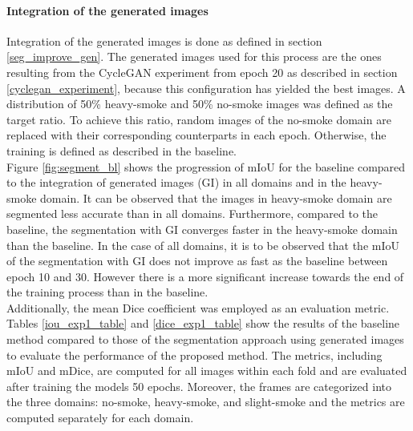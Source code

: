 \paragraph{Integration of the generated images} Integration of the generated images is done as defined in section \ref{seg_improve_gen}.
The generated images used for this process are the ones resulting from the CycleGAN experiment from epoch 20 as described in section \ref{cyclegan_experiment}, because this configuration has yielded the best images.
A distribution of 50\% heavy-smoke and 50\% no-smoke images was defined as the target ratio.
To achieve this ratio, random images of the no-smoke domain are replaced with their corresponding counterparts in each epoch.
Otherwise, the training is defined as described in the baseline.\\
Figure \ref{fig:segment_bl} shows the progression of mIoU for the baseline compared to the integration of generated images (GI) in all domains and in the heavy-smoke domain.
It can be observed that the images in heavy-smoke domain are segmented less accurate than in all domains.  
Furthermore, compared to the baseline, the segmentation with GI converges faster in the heavy-smoke domain than the baseline.
In the case of all domains, it is to be observed that the mIoU of the segmentation with GI does not improve as fast as the baseline between epoch 10 and 30.
However there is a more significant increase towards the end of the training process than in the baseline.\\
Additionally, the mean Dice coefficient was employed as an evaluation metric.
Tables \ref{iou_exp1_table} and \ref{dice_exp1_table} show the results of the baseline method compared to those of the segmentation approach using generated images to evaluate the performance of the proposed method.
The metrics, including mIoU and mDice, are computed for all images within each fold and are evaluated after training the models 50 epochs.
Moreover, the frames are categorized into the three domains: no-smoke, heavy-smoke, and slight-smoke and the metrics are computed separately for each domain.
